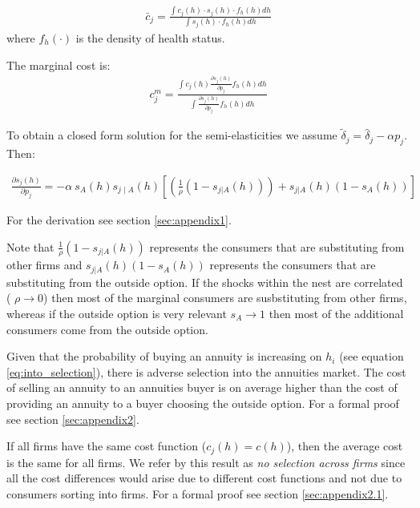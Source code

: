 \documentclass[12pt]{article}
\theoremstyle{plain}
\theoremstyle{plain}
\begin{document}
\begin{align}\label{eq:avg_cost}
    \bar{c}_j = \frac{\int c_j(h)\cdot s_j(h) \cdot f_h(h) dh}{\int  s_j(h) \cdot f_h(h) dh}
\end{align}
where $f_h(\cdot)$ is the density of health status. 

The marginal cost is: 
\begin{align}\label{eq:mg_cost}
    c^m_j = \frac{\int c_j(h) \frac{\partial s_j(h)}{\partial p_j}  f_h(h) dh }{\int \frac{\partial s_j(h)}{\partial p_j}  f_h(h) dh }
\end{align}

To obtain a closed form solution for the semi-elasticities we assume  $\tilde{\delta}_j = \hat{\delta}_j - \alpha p_j$. Then: 

\begin{align}\label{eq:price_der}
    \frac{\partial s_j(h)}{\partial p_j} 
    = -\alpha \ s_A(h) s_{j\mid A}(h) \left[ \left(\frac{1}{\rho}(1-s_{j|A}(h))\right)  + s_{j|A}(h)  (1-s_A(h)) \right]  
\end{align}

For the derivation see section \ref{sec:appendix1}.


Note that $\frac{1}{\rho}(1-s_{j|A}(h))$ represents the consumers that are substituting from other firms and $s_{j|A}(h)  (1-s_A(h))$ represents the consumers that are substituting from the outside option. 
If the shocks within the nest are correlated ( $\rho \rightarrow 0 $) then most of the marginal consumers are susbstituting from other firms, whereas if the outside option is very relevant $s_A \rightarrow 1 $ then most of the additional consumers come from the outside option. 


Given that the  probability of buying an annuity is increasing on $h_i$ (see equation \ref{eq:into_selection}), there is adverse selection into the annuities market. The cost of selling an annuity to an annuities buyer is on average higher than the cost of providing an annuity to a buyer choosing the outside option. For a formal proof see section \ref{sec:appendix2}.  

If all firms have the same cost function ($c_j(h) = c(h)$), then the average cost is the same for all firms. We refer by this result as \textit{no selection across firms} since all the cost differences would arise due to different cost functions and not due to consumers sorting into firms. For a formal proof see section \ref{sec:appendix2.1}.
\end{document}
